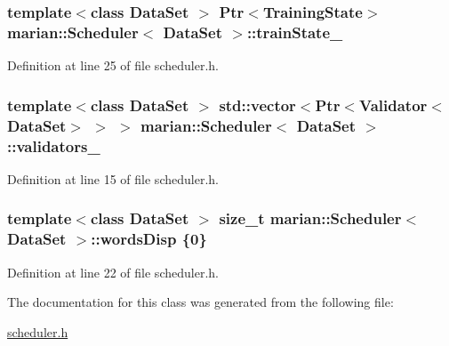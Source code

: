 \subsubsection[{\texorpdfstring{train\+State\+\_\+}{trainState_}}]{\setlength{\rightskip}{0pt plus 5cm}template$<$class Data\+Set $>$ {\bf Ptr}$<${\bf Training\+State}$>$ {\bf marian\+::\+Scheduler}$<$ Data\+Set $>$\+::train\+State\+\_\+\hspace{0.3cm}{\ttfamily [private]}}\hypertarget{classmarian_1_1Scheduler_adfe60998ce4ead7e9c0e6f7ff65a7ec7}{}\label{classmarian_1_1Scheduler_adfe60998ce4ead7e9c0e6f7ff65a7ec7}


Definition at line 25 of file scheduler.\+h.

\subsubsection[{\texorpdfstring{validators\+\_\+}{validators_}}]{\setlength{\rightskip}{0pt plus 5cm}template$<$class Data\+Set $>$ std\+::vector$<${\bf Ptr}$<${\bf Validator}$<$Data\+Set$>$ $>$ $>$ {\bf marian\+::\+Scheduler}$<$ Data\+Set $>$\+::validators\+\_\+\hspace{0.3cm}{\ttfamily [private]}}\hypertarget{classmarian_1_1Scheduler_aaaad6769ded3ed1fa5e307cde44fecdf}{}\label{classmarian_1_1Scheduler_aaaad6769ded3ed1fa5e307cde44fecdf}


Definition at line 15 of file scheduler.\+h.

\subsubsection[{\texorpdfstring{words\+Disp}{wordsDisp}}]{\setlength{\rightskip}{0pt plus 5cm}template$<$class Data\+Set $>$ size\+\_\+t {\bf marian\+::\+Scheduler}$<$ Data\+Set $>$\+::words\+Disp \{0\}\hspace{0.3cm}{\ttfamily [private]}}\hypertarget{classmarian_1_1Scheduler_a2609c2386b4afc3eb67c10e0da7ce975}{}\label{classmarian_1_1Scheduler_a2609c2386b4afc3eb67c10e0da7ce975}


Definition at line 22 of file scheduler.\+h.



The documentation for this class was generated from the following file\+:\begin{DoxyCompactItemize}
\item 
\hyperlink{scheduler_8h}{scheduler.\+h}\end{DoxyCompactItemize}
